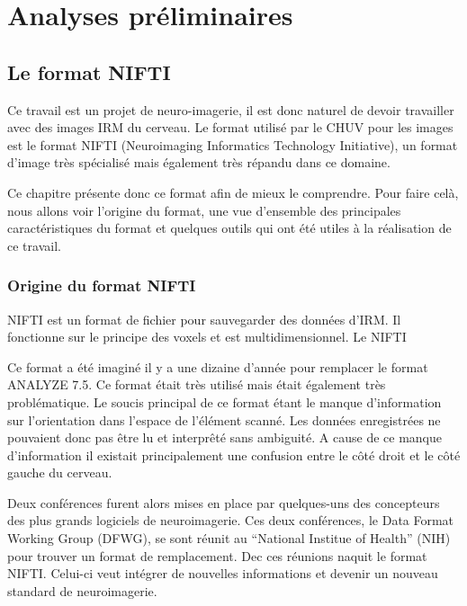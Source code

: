 \documentclass[a4paper,10pt,openany,oneside]{sphinxmanual}
\begin{document}
\chapter{Analyses préliminaires}
\label{index:analyses-preliminaires}

\section{Le format NIFTI}
\label{index:le-format-nifti}
Ce travail est un projet de neuro-imagerie, il est donc naturel de devoir travailler avec des
images IRM du cerveau. Le format utilisé par le CHUV pour les images est le format NIFTI
(Neuroimaging Informatics Technology Initiative), un format d'image très spécialisé mais
également très répandu dans ce domaine.

Ce chapitre présente donc ce format afin de mieux le comprendre. Pour faire celà, nous
allons voir l'origine du format, une vue d'ensemble des principales caractéristiques du format
et quelques outils qui ont été utiles à la réalisation de ce travail.


\subsection{Origine du format NIFTI}
\label{index:origine-du-format-nifti}
NIFTI est un format de fichier pour sauvegarder des données d'IRM. Il fonctionne
sur le principe des voxels et est multidimensionnel. Le NIFTI

Ce format a été imaginé il y a une dizaine d'année pour remplacer le format ANALYZE 7.5.
Ce format était très utilisé mais était également très problématique. Le soucis principal de
ce format étant le manque d'information sur l'orientation dans l'espace de l'élément scanné.
Les données enregistrées ne pouvaient donc pas être lu et interprêté sans ambiguité. A cause
de ce manque d'information il existait principalement une confusion entre le côté droit et le
côté gauche du cerveau.

Deux conférences furent alors mises en place par quelques-uns des concepteurs des plus grands
logiciels de neuroimagerie. Ces deux conférences, le Data Format Working Group (DFWG), se sont
réunit au ``National Institue of Health'' (NIH) pour trouver un format de remplacement. Dec ces
réunions naquit le format NIFTI. Celui-ci veut intégrer de nouvelles informations et devenir
un nouveau standard de neuroimagerie.
\end{document}
